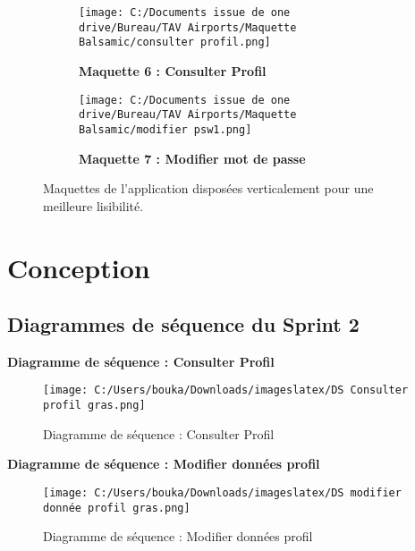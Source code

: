 \documentclass[a4paper,11pt]{report}
\begin{document}
\begin{figure}[H]
  \vspace{0.8cm}

  \begin{subfigure}[b]{0.8\textwidth}
    \texttt{[image: C:/Documents issue de one drive/Bureau/TAV Airports/Maquette Balsamic/consulter profil.png]}
    \caption{\textbf{Maquette 6 : Consulter Profil}}
    \label{fig:maquette5}
  \end{subfigure}

  \vspace{0.8cm}
\newpage
  \begin{subfigure}[b]{0.8\textwidth}
    \texttt{[image: C:/Documents issue de one drive/Bureau/TAV Airports/Maquette Balsamic/modifier psw1.png]}
    \caption{\textbf{Maquette 7 : Modifier mot de passe}}
    \label{fig:maquette6}
  \end{subfigure}

  \caption{Maquettes de l’application disposées verticalement pour une meilleure lisibilité.}
  \label{fig:vertical-maquettes}
\end{figure}




\newpage

\section{Conception}
\subsection{Diagrammes de séquence du Sprint 2}

\textbf{Diagramme de séquence : Consulter Profil}
\begin{figure}[htbp]
  \centering
  \texttt{[image: C:/Users/bouka/Downloads/imageslatex/DS Consulter profil gras.png]}
  \caption{Diagramme de séquence : Consulter Profil}
  \label{fig:consulter_profil}
\end{figure}
\newpage
\textbf{Diagramme de séquence : Modifier données profil}
\begin{figure}[htbp]
  \centering
  \texttt{[image: C:/Users/bouka/Downloads/imageslatex/DS modifier donnée profil gras.png]}
  \caption{Diagramme de séquence : Modifier données profil}
  \label{fig:modifier_donnees_profil}
\end{figure}
\end{document}

